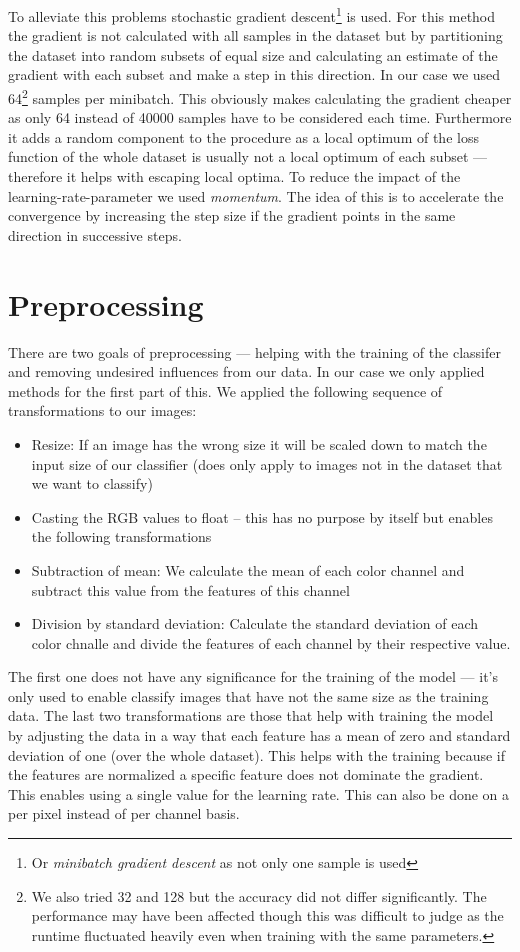 To alleviate this problems stochastic gradient descent\footnote{Or \textit{minibatch gradient descent} as not only one sample is used} is used. For this method the gradient is not calculated with all samples in the dataset but by partitioning the dataset into random subsets of equal size and calculating an estimate of the gradient with each subset and make a step in this direction. In our case we used 64\footnote{We also tried 32 and 128 but the accuracy did not differ significantly. The performance may have been affected though this was difficult to judge as the runtime  fluctuated heavily even when training with the same parameters.} samples per minibatch. This obviously makes calculating the gradient cheaper as only 64 instead of 40000 samples have to be considered each time. Furthermore it adds a random component to the procedure as a local optimum of the loss function of the whole dataset is usually not a local optimum of each subset --- therefore it helps with escaping local optima. To reduce the impact of the learning-rate-parameter we used \textit{momentum}. The idea of this is to accelerate the convergence by increasing the step size if the gradient points in the same direction in successive steps. 
\section{Preprocessing}
There are two goals of preprocessing --- helping with the training of the classifer and removing undesired influences from our data. In our case we only applied methods for the first part of this. We applied the following sequence of transformations to our images:
\begin{itemize}
\item Resize: If an image has the wrong size it will be scaled down to match the input size of our classifier (does only apply to images not in the dataset that we want to classify)
\item Casting the RGB values to float -- this has no purpose by itself but enables the following transformations
\item Subtraction of mean: We calculate the mean of each color channel and subtract this value from the features of this channel  
\item Division by standard deviation: Calculate the standard deviation of each color chnalle and divide the features of each channel by their respective value. 
\end{itemize}
The first one does not have any significance for the training of the model --- it's only used to enable classify images that have not the same size as the training data. The last two transformations are those that help with training the model by adjusting the data in a way that each feature has a mean of zero and standard deviation of one (over the whole dataset). This helps with the training because if the features are normalized a specific feature does not dominate the gradient. This enables using a single value for the learning rate. This can also be done on a per pixel instead of per channel basis.

